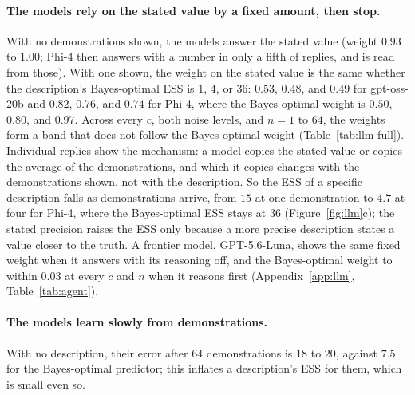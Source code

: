 \documentclass{article}
\begin{document}
\paragraph{The models rely on the stated value by a fixed amount, then stop.} With no demonstrations shown, the models answer the stated value (weight $0.93$ to $1.00$; Phi-4 then answers with a number in only a fifth of replies, and is read from those). With one shown, the weight on the stated value is the same whether the description's Bayes-optimal ESS is $1$, $4$, or $36$: $0.53$, $0.48$, and $0.49$ for gpt-oss-20b and $0.82$, $0.76$, and $0.74$ for Phi-4, where the Bayes-optimal weight is $0.50$, $0.80$, and $0.97$. Across every $c$, both noise levels, and $n = 1$ to $64$, the weights form a band that does not follow the Bayes-optimal weight (Table~\ref{tab:llm-full}). Individual replies show the mechanism: a model copies the stated value or copies the average of the demonstrations, and which it copies changes with the demonstrations shown, not with the description. So the ESS of a specific description falls as demonstrations arrive, from $15$ at one demonstration to $4.7$ at four for Phi-4, where the Bayes-optimal ESS stays at $36$ (Figure~\ref{fig:llm}c); the stated precision raises the ESS only because a more precise description states a value closer to the truth. A frontier model, GPT-5.6-Luna, shows the same fixed weight when it answers with its reasoning off, and the Bayes-optimal weight to within $0.03$ at every $c$ and $n$ when it reasons first (Appendix~\ref{app:llm}, Table~\ref{tab:agent}).

\paragraph{The models learn slowly from demonstrations.} With no description, their error after $64$ demonstrations is $18$ to $20$, against $7.5$ for the Bayes-optimal predictor; this inflates a description's ESS for them, which is small even so.
\end{document}
